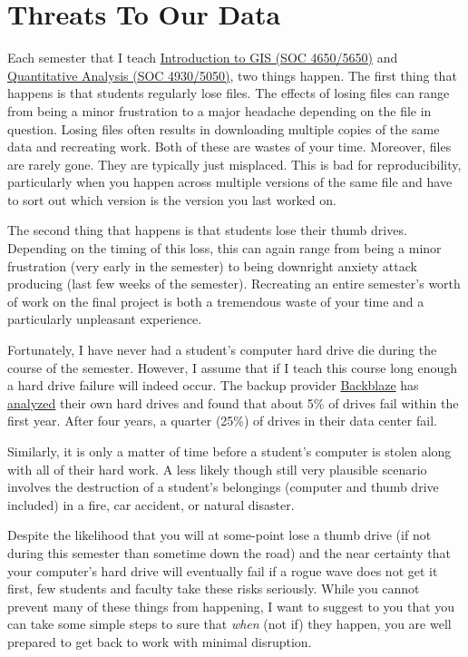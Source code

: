 \documentclass[]{book}
\theoremstyle{definition}
\theoremstyle{definition}
\theoremstyle{definition}
\theoremstyle{remark}
\begin{document}
\section{Threats To Our Data}\label{threats-to-our-data}

Each semester that I teach
\href{https://slu-soc5650.github.io}{Introduction to GIS (SOC
4650/5650)} and \href{https://slu-soc5050.github.io}{Quantitative
Analysis (SOC 4930/5050)}, two things happen. The first thing that
happens is that students regularly lose files. The effects of losing
files can range from being a minor frustration to a major headache
depending on the file in question. Losing files often results in
downloading multiple copies of the same data and recreating work. Both
of these are wastes of your time. Moreover, files are rarely gone. They
are typically just misplaced. This is bad for reproducibility,
particularly when you happen across multiple versions of the same file
and have to sort out which version is the version you last worked on.

The second thing that happens is that students lose their thumb drives.
Depending on the timing of this loss, this can again range from being a
minor frustration (very early in the semester) to being downright
anxiety attack producing (last few weeks of the semester). Recreating an
entire semester's worth of work on the final project is both a
tremendous waste of your time and a particularly unpleasant experience.

Fortunately, I have never had a student's computer hard drive die during
the course of the semester. However, I assume that if I teach this
course long enough a hard drive failure will indeed occur. The backup
provider \href{https://www.backblaze.com/}{Backblaze} has
\href{https://www.backblaze.com/blog/how-long-do-disk-drives-last/}{analyzed}
their own hard drives and found that about 5\% of drives fail within the
first year. After four years, a quarter (25\%) of drives in their data
center fail.

Similarly, it is only a matter of time before a student's computer is
stolen along with all of their hard work. A less likely though still
very plausible scenario involves the destruction of a student's
belongings (computer and thumb drive included) in a fire, car accident,
or natural disaster.

Despite the likelihood that you will at some-point lose a thumb drive
(if not during this semester than sometime down the road) and the near
certainty that your computer's hard drive will eventually fail if a
rogue wave does not get it first, few students and faculty take these
risks seriously. While you cannot prevent many of these things from
happening, I want to suggest to you that you can take some simple steps
to sure that \emph{when} (not if) they happen, you are well prepared to
get back to work with minimal disruption.
\end{document}
